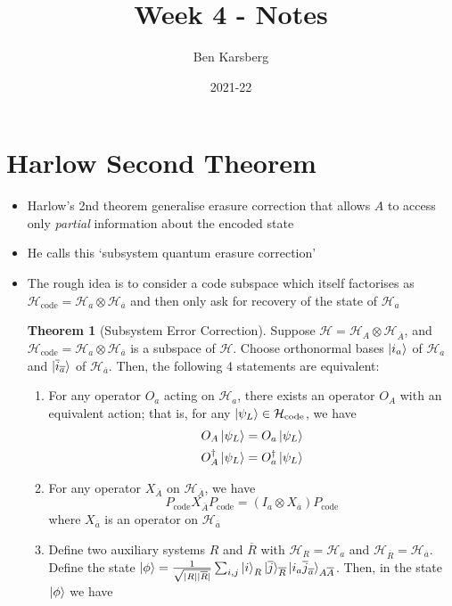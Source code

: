 \documentclass[12pt,a4paper]{article}
\title{Week 4 - Notes}
\author{Ben Karsberg}
\date{2021-22}
\numberwithin{equation}{section}
\newcommand{\Pc}{P_{\text{code}}}
\newcommand{\Hcode}{\mathcal{H}_{\text{code}}}
\newcommand{\ol}[1]{\overline{#1}}
\theoremstyle{definition}
\theoremstyle{theorem}
\newtheorem{theorem}{Theorem}[section]
\theoremstyle{example}
\begin{document}
	\maketitle
	\section{Harlow Second Theorem}
	\begin{itemize}
		\item Harlow's 2nd theorem generalise erasure correction that allows $A$ to access only \textit{partial} information about the encoded state
		\item He calls this `subsystem quantum erasure correction'
		\item The rough idea is to consider a code subspace which itself factorises as $\Hcode=\mathcal{H}_{a}\otimes\mathcal{H}_{\overline{a}}$ and then only ask for recovery of the state of $\mathcal{H}_{a}$
		\begin{theorem}[Subsystem Error Correction]
			Suppose $\mathcal{H}=\mathcal{H}_{A}\otimes\mathcal{H}_{\overline{A}}$, and $\Hcode=\mathcal{H}_{a}\otimes\mathcal{H}_{\overline{a}}$ is a subspace of $\mathcal{H}$. Choose orthonormal bases $\ket{i_{a}}$ of $\mathcal{H}_{a}$ and $\ket{\overline{i}_{\overline{a}}}$ of $\mathcal{H}_{\overline{a}}$. Then, the following 4 statements are equivalent:
			\begin{enumerate}
				\item For any operator $O_{a}$ acting on $\mathcal{H}_{a}$, there exists an operator $O_{A}$ with an equivalent action; that is, for any $\ket{\psi_{L}}\in\Hcode$, we have
				\begin{equation}
					\begin{aligned}
						O_{A}\ket{\psi_{L}}&=O_{a}\ket{\psi_{L}}\\
						O^{\dagger}_{A}\ket{\psi_{L}}&=O_{a}^{\dagger}\ket{\psi_{L}}
					\end{aligned}
				\end{equation}
				\item For any operator $X_{\overline{A}}$ on $\mathcal{H}_{\overline{A}}$, we have
				\begin{equation}
					\Pc X_{\overline{A}}\Pc=(I_{a}\otimes X_{\overline{a}})\Pc
				\end{equation}
				where $X_{\overline{a}}$ is an operator on $\mathcal{H}_{\overline{a}}$
				\item Define two auxiliary systems $R$ and $\overline{R}$ with $\mathcal{H}_{R}=\mathcal{H}_{a}$ and $\mathcal{H}_{\overline{R}}=\mathcal{H}_{\overline{a}}$. Define the state $\ket{\phi}=\frac{1}{\sqrt{|R||\overline{R}|}}\sum_{i,j}\ket{i}_{R}\ket{\ol{j}}_{\overline{R}}\ket{i_{a}\ol{j}_{\ol{a}}}_{A\ol{A}}$. Then, in the state $\ket{\phi}$ we have

\end{enumerate}
\end{theorem}
\end{itemize}
\end{document}
